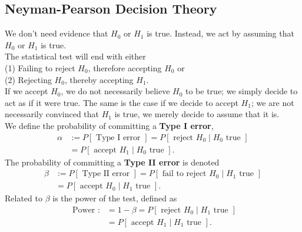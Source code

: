 \documentclass[a4paper,12pt]{article}
\begin{document}
\subsection{Neyman-Pearson Decision Theory}
We don't need evidence that $H_0$ or $H_1$ is true. Instead, we act by assuming that $H_0$ or $H_1$ is true.\\
The statistical test will end with either\\
(1) Failing to reject $H_0$, therefore accepting $H_0$ or\\
(2) Rejecting $H_0$, thereby accepting $H_1$.\\
If we accept $H_0$, we do not necessarily believe $H_0$ to be true; we simply decide to act as if it were true. The same is the case if we decide to accept $H_1$; we are not necessarily convinced that $H_1$ is true, we merely decide to assume that it is.\\
We define the probability of committing a \textbf{Type I error},
$$
\begin{aligned}
\alpha & :=P[\text { Type I error }]=P\left[\text { reject } H_0 \mid H_0 \text { true }\right] \\
& =P\left[\text { accept } H_1 \mid H_0 \text { true }\right] .
\end{aligned}
$$
The probability of committing a \textbf{Type II error} is denoted
$$
\begin{aligned}
\beta & :=P[\text { Type II error }]=P\left[\text { fail to reject } H_0 \mid H_1 \text { true }\right] \\
& =P\left[\text { accept } H_0 \mid H_1 \text { true }\right] .
\end{aligned}
$$
Related to $\beta$ is the power of the test, defined as
$$
\begin{aligned}
\text { Power }: & =1-\beta=P\left[\text { reject } H_0 \mid H_1 \text { true }\right] \\
& =P \left[\text { accept } H_1 \mid H_1 \text { true }\right] .
\end{aligned}
$$
\end{document}
